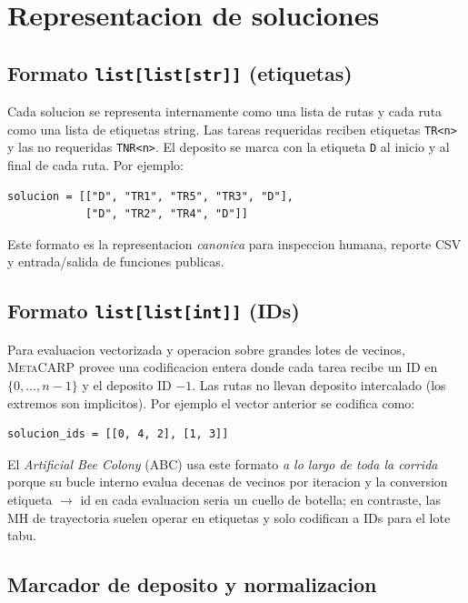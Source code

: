 \documentclass[11pt,a4paper]{article}
\newcommand{\mh}{MH}
\newcommand{\op}[1]{\texttt{#1}}
\begin{document}
\section{Representacion de soluciones}\label{sec:representacion}

\subsection{Formato \texttt{list[list[str]]} (etiquetas)}

Cada solucion se representa internamente como una lista de rutas y
cada ruta como una lista de etiquetas string. Las tareas requeridas
reciben etiquetas \op{TR<n>} y las no requeridas \op{TNR<n>}. El
deposito se marca con la etiqueta \op{D} al inicio y al final de cada
ruta. Por ejemplo:
\begin{verbatim}
solucion = [["D", "TR1", "TR5", "TR3", "D"],
            ["D", "TR2", "TR4", "D"]]
\end{verbatim}

Este formato es la representacion \emph{canonica} para inspeccion
humana, reporte CSV y entrada/salida de funciones publicas.

\subsection{Formato \texttt{list[list[int]]} (IDs)}

Para evaluacion vectorizada y operacion sobre grandes lotes de
vecinos, \textsc{MetaCARP} provee una codificacion entera donde cada
tarea recibe un ID en $\{0,\dots,n-1\}$ y el deposito ID $-1$. Las
rutas no llevan deposito intercalado (los extremos son implicitos).
Por ejemplo el vector anterior se codifica como:
\begin{verbatim}
solucion_ids = [[0, 4, 2], [1, 3]]
\end{verbatim}

El \emph{Artificial Bee Colony} (ABC) usa este formato \emph{a lo
largo de toda la corrida} porque su bucle interno evalua decenas de
vecinos por iteracion y la conversion etiqueta $\to$ id en cada
evaluacion seria un cuello de botella; en contraste, las \mh{} de
trayectoria suelen operar en etiquetas y solo codifican a IDs para el
lote tabu.

\subsection{Marcador de deposito y normalizacion}
\end{document}
